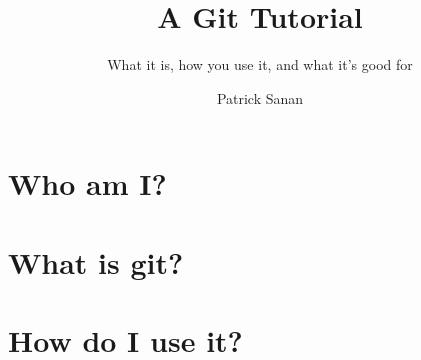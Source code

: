 \documentclass{beamer}
\author{Patrick Sanan}
\institute[USI Lugano ICS / ETH Z\"{u}rich ERDW] 
{
USI Lugano / ETH Z\"{u}rich\\
}
\title{A Git Tutorial}
\subtitle[]{What it is, how you use it, and what it's good for}
\date[]{}
\begin{document}

\begin{frame}[fragile]
\titlepage 
\end{frame}


\begin{frame}
\tableofcontents 
\end{frame}

\section{Who am I?}

\section{What is git?}




\section{How do I use it?}
\end{document}
